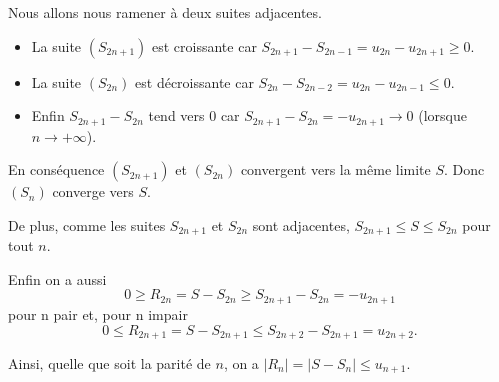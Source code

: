 \documentclass[french]{yLectureNote}
\begin{document}
\begin{myproof}
Nous allons nous ramener à deux suites adjacentes.
\begin{itemize}
  \item La suite $(S_{2n+1})$ est croissante car
  $S_{2n+1}-S_{2n-1}=u_{2n}-u_{2n+1}\ge 0$.

  \item La suite $(S_{2n})$ est décroissante car
  $S_{2n}-S_{2n-2}= u_{2n}-u_{2n-1}\le 0$.


  \item Enfin $S_{2n+1} - S_{2n}$ tend vers $0$
  car $S_{2n+1} - S_{2n} = -u_{2n+1} \to 0$
  (lorsque $n\to+\infty$).
\end{itemize}
En conséquence $(S_{2n+1})$ et $(S_{2n})$ convergent vers la même limite $S$.
Donc $(S_n)$ converge vers $S$.
\bigskip

De plus, comme les suites \(S_{2n+1}\) et \(S_{2n}\) sont adjacentes,  $S_{2n+1} \le S \le S_{2n}$ pour tout $n$.

Enfin on a aussi
 $$0\ge R_{2n}= S-S_{2n} \ge S_{2n+1}-S_{2n}=-u_{2n+1}$$ pour n pair et, pour n impair
 $$0\le R_{2n+1}= S-S_{2n+1} \le  S_{2n+2} -S_{2n+1}= u_{2n+2}.$$

 Ainsi, quelle que soit la parité de $n$, on a
 $|R_n|=|S-S_n|\le  u_{n+1}$.
 \end{myproof}
\end{document}
